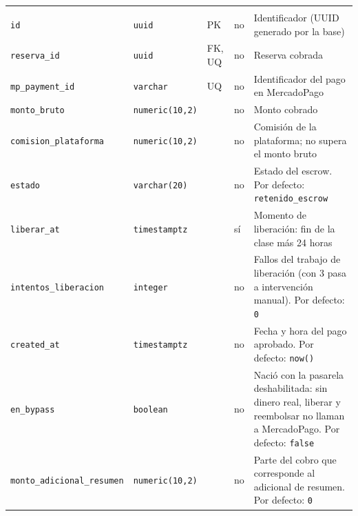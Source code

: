 {\small
\begin{xltabular}{\textwidth}{@{}>{\raggedright\arraybackslash}p{3.6cm} >{\raggedright\arraybackslash}p{2.3cm} >{\raggedright\arraybackslash}p{1cm} >{\centering\arraybackslash}p{0.85cm} L@{}}
    \toprule
     &  &  &  &  \\
    \midrule
    \endfirsthead
    \toprule
     &  &  &  &  \\
    \midrule
    \endhead
    \bottomrule
    \endfoot
    \texttt{id} & \texttt{uuid} & PK & no & Identificador (UUID generado por la base) \\
    \texttt{reserva\_\allowbreak{}id} & \texttt{uuid} & FK, UQ & no & Reserva cobrada \\
    \texttt{mp\_\allowbreak{}payment\_\allowbreak{}id} & \texttt{varchar} & UQ & no & Identificador del pago en MercadoPago \\
    \texttt{monto\_\allowbreak{}bruto} & \texttt{numeric(\allowbreak{}10,\allowbreak{}2)} &  & no & Monto cobrado \\
    \texttt{comision\_\allowbreak{}plataforma} & \texttt{numeric(\allowbreak{}10,\allowbreak{}2)} &  & no & Comisión de la plataforma; no supera el monto bruto \\
    \texttt{estado} & \texttt{varchar(\allowbreak{}20)} &  & no & Estado del \gls{escrow}. Por defecto: \texttt{\textquotesingle{}retenido\_\allowbreak{}escrow\textquotesingle{}} \\
    \texttt{liberar\_\allowbreak{}at} & \texttt{timestamptz} &  & sí & Momento de liberación: fin de la clase más 24 horas \\
    \texttt{intentos\_\allowbreak{}liberacion} & \texttt{integer} &  & no & Fallos del trabajo de liberación (con 3 pasa a intervención manual). Por defecto: \texttt{0} \\
    \texttt{created\_\allowbreak{}at} & \texttt{timestamptz} &  & no & Fecha y hora del pago aprobado. Por defecto: \texttt{now(\allowbreak{})} \\
    \texttt{en\_\allowbreak{}bypass} & \texttt{boolean} &  & no & Nació con la pasarela deshabilitada: sin dinero real, liberar y reembolsar no llaman a MercadoPago. Por defecto: \texttt{false} \\
    \texttt{monto\_\allowbreak{}adicional\_\allowbreak{}resumen} & \texttt{numeric(\allowbreak{}10,\allowbreak{}2)} &  & no & Parte del cobro que corresponde al adicional de resumen. Por defecto: \texttt{0} \\

\end{xltabular}}
